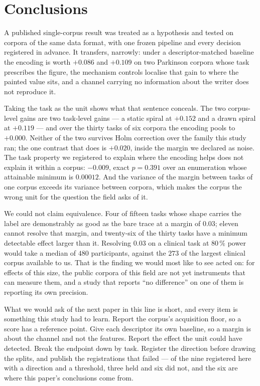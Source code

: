\section{Conclusions}
\label{sec:conclusions}

A published single-corpus result was treated as a hypothesis and tested on corpora of the same data
format, with one frozen pipeline and every decision registered in advance. It transfers, narrowly:
under a descriptor-matched baseline the encoding is worth $+0.086$ and $+0.109$ on two Parkinson
corpora whose task prescribes the figure, the mechanism controls localise that gain to where the
painted value sits, and a channel carrying no information about the writer does not reproduce it.

Taking the task as the unit shows what that sentence conceals. The two corpus-level gains are two
task-level gains --- a static spiral at $+0.152$ and a drawn spiral at $+0.119$ --- and over the
thirty tasks of six corpora the encoding pools to $+0.000$. Neither of the two survives Holm
correction over the family this study ran; the one contrast that does is $+0.020$, inside the margin
we declared as noise. The task property we registered to explain where the encoding helps does not
explain it within a corpus: $-0.009$, exact $p = 0.391$ over an enumeration whose attainable minimum
is $0.00012$. And the variance of the margin between tasks of one corpus exceeds its variance
between corpora, which makes the corpus the wrong unit for the question the field asks of it.

We could not claim equivalence. Four of fifteen tasks whose shape carries the label are
demonstrably as good as the bare trace at a margin of $0.03$; eleven cannot resolve that margin, and
twenty-six of the thirty tasks have a minimum detectable effect larger than it. Resolving $0.03$ on
a clinical task at $80\,\%$ power would take a median of $480$ participants, against the $273$ of
the largest clinical corpus available to us. That is the finding we would most like to see acted on:
for effects of this size, the public corpora of this field are not yet instruments that can measure
them, and a study that reports ``no difference'' on one of them is reporting its own precision.

What we would ask of the next paper in this line is short, and every item is something this study
had to learn. Report the corpus's acquisition floor, so a score has a reference point. Give each
descriptor its own baseline, so a margin is about the channel and not the features. Report the effect
the unit could have detected. Break the endpoint down by task. Register the direction before drawing
the splits, and publish the registrations that failed --- of the nine registered here with a
direction and a threshold, three held and six did not, and the six are where this paper's
conclusions come from.
